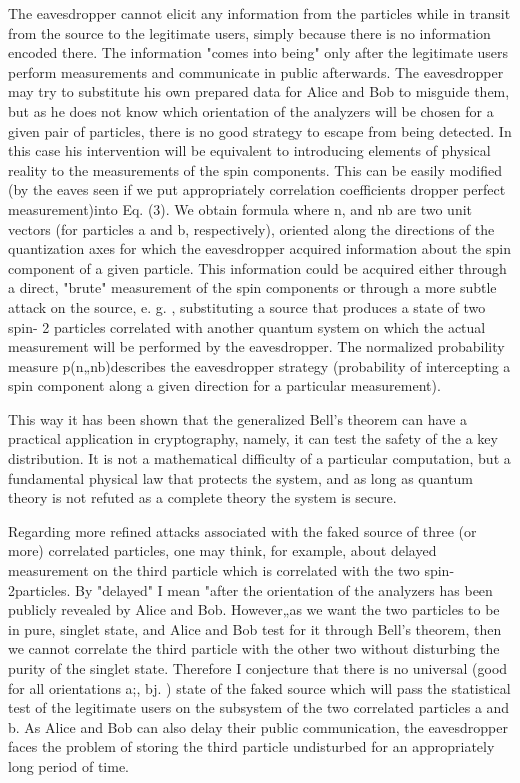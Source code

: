 The eavesdropper cannot elicit any information from the particles while in transit from the source to the legitimate users, simply because there is no information encoded there. The information "comes into being" only after the legitimate users perform measurements and communicate in public afterwards. The eavesdropper may try to substitute his own prepared data for Alice and Bob to misguide them, but as he does not know which orientation of the analyzers will be chosen for a given pair of particles, there is no good strategy to escape from being detected. In this case his intervention will be equivalent to introducing elements of physical reality to the measurements of the spin components. This can be easily modified (by the eaves seen if we put appropriately correlation coefficients dropper perfect measurement)into Eq. (3). We obtain formula where n, and nb are two unit vectors (for particles a and b, respectively), oriented along the directions of the quantization axes for which the eavesdropper acquired information about the spin component of a given particle. This information could be acquired either through a direct, "brute" measurement of the spin components or through a more subtle attack on the source, e. g. , substituting a source that produces a state of two spin- 2 particles correlated with another quantum system on which the actual measurement will be performed by the eavesdropper. The normalized probability measure p(n„nb)describes the eavesdropper strategy (probability of intercepting a spin component along a given direction for a particular measurement).

This way it has been shown that the generalized Bell's theorem can have a practical application in cryptography, namely, it can test the safety of the a key distribution. It is not a mathematical difficulty of a particular computation, but a fundamental physical law that protects the system, and as long as quantum theory is not refuted as a complete theory the system is secure.

Regarding more refined attacks associated with the faked source of three (or more) correlated particles, one may think, for example, about delayed measurement on the third particle which is correlated with the two spin- 2particles. By "delayed" I mean "after the orientation of the analyzers has been publicly revealed by Alice and Bob. However„as we want the two particles to be in pure, singlet state, and Alice and Bob test for it through Bell's theorem, then we cannot correlate the third particle with the other two without disturbing the purity of the singlet state. Therefore I conjecture that there is no universal (good for all orientations a;, bj. ) state of the faked source which will pass the statistical test of the legitimate users on the subsystem of the two correlated particles a and b. As Alice and Bob can also delay their public communication, the eavesdropper faces the problem of storing the third particle undisturbed for an appropriately long period of time.


